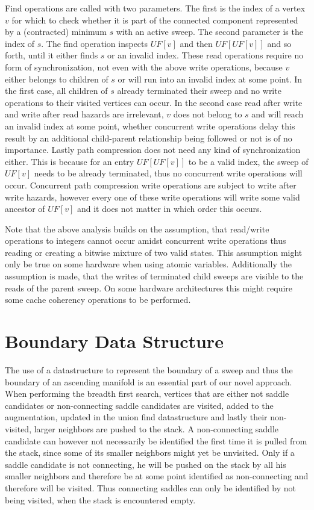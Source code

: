 \documentclass[%
	paper=A4,					%
	twoside=true,				%
	openright,					%
	parskip=full,				%
	chapterprefix=true,			%
	11pt,						%
	headings=normal,			%
	bibliography=totoc,			%
	listof=totoc,				%
	titlepage=on,				%
	captions=tableabove,		%
	draft=false,				%
]{scrreprt}%
\begin{document}
Find operations are called with two parameters. The first is the index of a vertex \(v\) for which to check whether it is part of the connected component represented by a (contracted) minimum \(s\) with an active sweep. The second parameter is the index of \(s\). The find operation inspects \(UF[v]\) and then \(UF[UF[v]]\) and so forth, until it either finds \(s\) or an invalid index. These read operations require no form of synchronization, not even with the above write operations, because \(v\) either belongs to children of \(s\) or will run into an invalid index at some point. In the first case, all children of \(s\) already terminated their sweep and no write operations to their visited vertices can occur. In the second case read after write and write after read hazards are irrelevant, \(v\) does not belong to \(s\) and will reach an invalid index at some point, whether concurrent write operations delay this result by an additional child-parent relationship being followed or not is of no importance. Lastly path compression does not need any kind of synchronization either. This is because for an entry \(UF[UF[v]]\) to be a valid index, the sweep of \(UF[v]\) needs to be already terminated, thus no concurrent write operations will occur. Concurrent path compression write operations are subject to write after write hazards, however every one of these write operations will write some valid ancestor of \(UF[v]\) and it does not matter in which order this occurs.

Note that the above analysis builds on the assumption, that read/write operations to integers cannot occur amidst concurrent write operations thus reading or creating a bitwise mixture of two valid states. This assumption might only be true on some hardware when using atomic variables.
Additionally the assumption is made, that the writes of terminated child sweeps are visible to the reads of the parent sweep. On some hardware architectures this might require some cache coherency operations to be performed.

\section{Boundary Data Structure}
The use of a datastructure to represent the boundary of a sweep and thus the boundary of an ascending manifold is an essential part of our novel approach. When performing the breadth first search, vertices that are either not saddle candidates or non-connecting saddle candidates are visited, added to the augmentation, updated in the union find datastructure and lastly their non-visited, larger neighbors are pushed to the stack. A non-connecting saddle candidate can however not necessarily be identified the first time it is pulled from the stack, since some of its smaller neighbors might yet be unvisited. Only if a saddle candidate is not connecting, he will be pushed on the stack by all his smaller neighbors and therefore be at some point identified as non-connecting and therefore will be visited. Thus connecting saddles can only be identified by not being visited, when the stack is encountered empty. 
\end{document}
